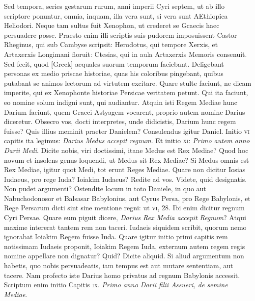 Sed tempora,
series gestarum rurum, anni imperii Cyri septem, ut ab illo
scriptore ponuntur, omnia, inquam, illa vera sunt, si vera sunt AEthiopica
Heliodori.
Neque tam sultus fuit Xenophon, ut crederet se
Graecis haec persuadere posse.
Praesto enim illi scriptis suis pudorem
imposuissent Castor Rheginus, qui sub Cambyse scripsit: Herodotus,
qui tempore Xerxis, et Artaxerxis Longimani floruit: Ctesias, qui in
aula Artaxerxis Memoris consenuit.
Sed fecit, quod \textgreek{[Greek]} aequales
suorum temporum faciebant.
Deligebant personas ex medio priscae
historiae, quas his coloribus pingebant, quibus putabant se animos
lectorum ad virtutem excitare.
Quare stulte faciunt, ne dicam
imperite, qui ex Xenophonte historiae Persicae veritatem petunt.
Qui ita faciunt, eo nomine solum indigni sunt, qui audiantur.
Atquin isti Regem Mediae hunc Darium faciunt, quem Graeci Astyagem
vocarent, proprio autem nomine Darius diceretur.
Obsecro
vos, docti interpretes, unde didicistis, Darium hunc regem fuisse?
Quis illius meminit praeter Danielem?
Consulendus igitur Daniel.
Initio \textsc{vi} capitis ita legimus:
 \textit{Darius Medus accepit regnum}.
Et initio \textsc{xi}: \textit{Primo autem anno Darii Medi}.
Dicite nobis, viri doctissimi, itane
Medus est Rex Mediae?
Quod hoc novum et insolens genus loquendi,
ut Medus sit Rex Mediae?
Si Medus omnis est Rex Mediae,
igitur quot Medi, tot erunt Reges Mediae.
Quare non dicitur Iosias
Iudaeus, pro rege Iuda?
Ioiakim Iudaeus?
Redite ad vos.
Videte, quid
designatis.
Non pudet argumenti?
Ostendite locum in toto Daniele,
in quo aut Nabuchodonosor et Balsasar Babylonius, aut Cyrus
Persa, pro Rege Babylonis, et Rege Persarum dicti sint sine mentione
regni: ut \textsc{vi}, 28.
Ibi enim dicitur regnum Cyri Persae.
Quare eum piguit dicere, \textit{Darius Rex Media accepit Regnum}?
Atqui maxime intererat
tantem rem non taceri.
Iudaeis siquidem scribit, quorum nemo
ignorabat Ioiakim Regem fuisse Iuda.
Quare igitur initio primi
capitis rem notissimam Iudaeis proponit, Ioiakim Regem Iuda, externum
autem regem regis nomine appellare non dignatur?
Quid?
Dicite aliquid.
Si aliud argumentum non habetis, quo nobis persuadeatis,
iam tempus est aut mutare sententiam, aut tacere.
Nam profecto iste Darius homo privatus ad regnum Babylonis accessit.
Scriptum
enim initio Capitis \textsc{ix}.
\textit{Primo anno Darii filii Assueri, de semine
Mediae}.
